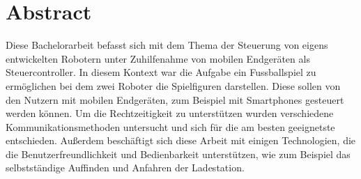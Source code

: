 \chapter*{Abstract}
Diese Bachelorarbeit befasst sich mit dem Thema der Steuerung von eigens entwickelten Robotern unter Zuhilfenahme von mobilen Endgeräten als Steuercontroller. In diesem Kontext war die Aufgabe ein Fussballspiel zu ermöglichen bei dem zwei Roboter die Spielfiguren darstellen. Diese sollen von den Nutzern mit mobilen Endgeräten, zum Beispiel mit Smartphones gesteuert werden können. Um die Rechtzeitigkeit zu unterstützen wurden verschiedene Kommunikationsmethoden untersucht und sich für die am besten geeignetste entschieden. Außerdem beschäftigt sich diese Arbeit mit einigen Technologien, die die Benutzerfreundlichkeit und Bedienbarkeit unterstützen, wie zum Beispiel das selbstständige Auffinden und Anfahren der Ladestation.